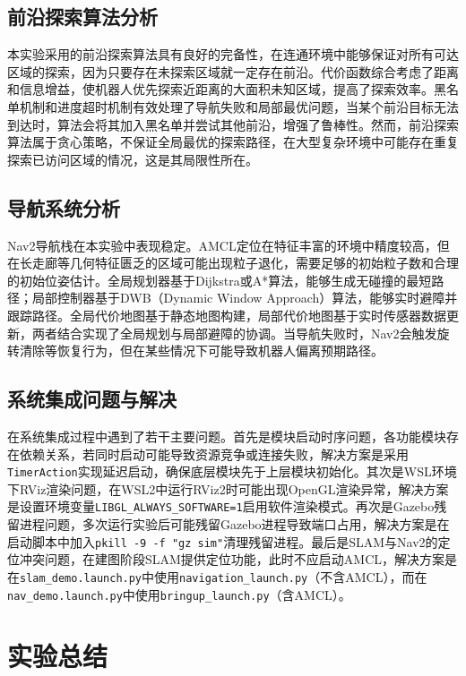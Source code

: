 \documentclass[a4paper,12pt]{article}
\begin{document}
\subsection{前沿探索算法分析}

本实验采用的前沿探索算法具有良好的完备性，在连通环境中能够保证对所有可达区域的探索，因为只要存在未探索区域就一定存在前沿。代价函数综合考虑了距离和信息增益，使机器人优先探索近距离的大面积未知区域，提高了探索效率。黑名单机制和进度超时机制有效处理了导航失败和局部最优问题，当某个前沿目标无法到达时，算法会将其加入黑名单并尝试其他前沿，增强了鲁棒性。然而，前沿探索算法属于贪心策略，不保证全局最优的探索路径，在大型复杂环境中可能存在重复探索已访问区域的情况，这是其局限性所在。

\subsection{导航系统分析}

Nav2导航栈在本实验中表现稳定。AMCL定位在特征丰富的环境中精度较高，但在长走廊等几何特征匮乏的区域可能出现粒子退化，需要足够的初始粒子数和合理的初始位姿估计。全局规划器基于Dijkstra或A*算法，能够生成无碰撞的最短路径；局部控制器基于DWB（Dynamic Window Approach）算法，能够实时避障并跟踪路径。全局代价地图基于静态地图构建，局部代价地图基于实时传感器数据更新，两者结合实现了全局规划与局部避障的协调。当导航失败时，Nav2会触发旋转清除等恢复行为，但在某些情况下可能导致机器人偏离预期路径。

\subsection{系统集成问题与解决}

在系统集成过程中遇到了若干主要问题。首先是模块启动时序问题，各功能模块存在依赖关系，若同时启动可能导致资源竞争或连接失败，解决方案是采用\texttt{TimerAction}实现延迟启动，确保底层模块先于上层模块初始化。其次是WSL环境下RViz渲染问题，在WSL2中运行RViz2时可能出现OpenGL渲染异常，解决方案是设置环境变量\texttt{LIBGL\_ALWAYS\_SOFTWARE=1}启用软件渲染模式。再次是Gazebo残留进程问题，多次运行实验后可能残留Gazebo进程导致端口占用，解决方案是在启动脚本中加入\texttt{pkill -9 -f "gz sim"}清理残留进程。最后是SLAM与Nav2的定位冲突问题，在建图阶段SLAM提供定位功能，此时不应启动AMCL，解决方案是在\texttt{slam\_demo.launch.py}中使用\texttt{navigation\_launch.py}（不含AMCL），而在\texttt{nav\_demo.launch.py}中使用\texttt{bringup\_launch.py}（含AMCL）。

\section{实验总结}
\end{document}
